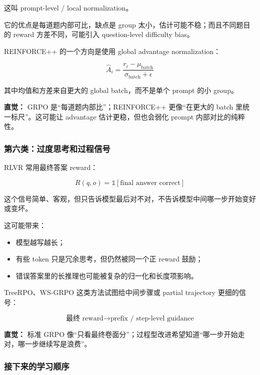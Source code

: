 这叫 prompt-level / local normalization。

它的优点是每道题内部可比，缺点是 group 太小，估计可能不稳；而且不同题目的 reward 方差不同，可能引入 question-level difficulty bias。

REINFORCE++ 的一个方向是使用 global advantage normalization：

\[
\hat{A}_i
=
\frac{r_i-\mu_\text{batch}}{\sigma_\text{batch}+\epsilon}
\]

其中均值和方差来自更大的 global batch，而不是单个 prompt 的小 group。

\begin{intubox}
\textbf{直觉：} GRPO 是“每道题内部比”；REINFORCE++ 更像“在更大的 batch 里统一标尺”。这可能让 advantage 估计更稳，但也会弱化 prompt 内部对比的纯粹性。
\end{intubox}

\subsubsection{第六类：过度思考和过程信号}

RLVR 常用最终答案 reward：

\[
R(q,o)=
\mathbb{1}[\text{final answer correct}]
\]

这个信号简单、客观，但只告诉模型最后对不对，不告诉模型中间哪一步开始变好或变坏。

这可能带来：

\begin{itemize}[leftmargin=1.5em]
  \item 模型越写越长；
  \item 有些 token 只是冗余思考，但仍然被同一个正 reward 鼓励；
  \item 错误答案里的长推理也可能被复杂的归一化和长度项影响。
\end{itemize}

TreeRPO、WS-GRPO 这类方法试图给中间步骤或 partial trajectory 更细的信号：

\[
\text{最终 reward}
\to
\text{prefix / step-level guidance}
\]

\begin{summarybox}
\textbf{直觉：} 标准 GRPO 像“只看最终卷面分”；过程型改进希望知道“哪一步开始走对，哪一步继续写是浪费”。
\end{summarybox}

\subsubsection{接下来的学习顺序}

